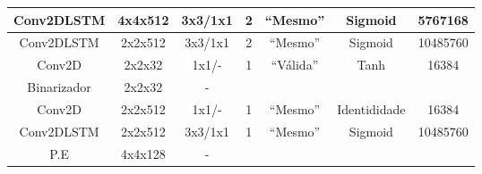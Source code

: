\begin{table}[htbp]
\begin{tabular}{|c|c|c|c|c|c|c|}
		Conv2DLSTM      & 4x4x512                                                              & 3x3/1x1                                                                                 & 2              & ``Mesmo''                   & Sigmoid                                                               & 5767168                                                                 \\ \hline
		Conv2DLSTM      & 2x2x512                                                              & 3x3/1x1                                                                                 & 2              & ``Mesmo''                   & Sigmoid                                                               & 10485760                                                                \\ \hline
		Conv2D          & 2x2x32                                                               & 1x1/-                                                                                   & 1              & ``Válida''                  & Tanh                                                                  & 16384                                                                   \\ \hline
		Binarizador     & 2x2x32                                                               & -                                                                                       &                &                        &                                                                       &                                                                         \\ \hline
		Conv2D          & 2x2x512                                                              & 1x1/-                                                                                   & 1              & ``Mesmo''                   & Identididade                                                          & 16384                                                                   \\ \hline
		Conv2DLSTM      & 2x2x512                                                              & 3x3/1x1                                                                                 & 1              & ``Mesmo''                   & Sigmoid                                                               & 10485760                                                                \\ \hline
		P.E             & 4x4x128                                                              & -                                                                                       &                &                        &                                                                       &                                                                         \\ \hline

\end{tabular}
\end{table}
